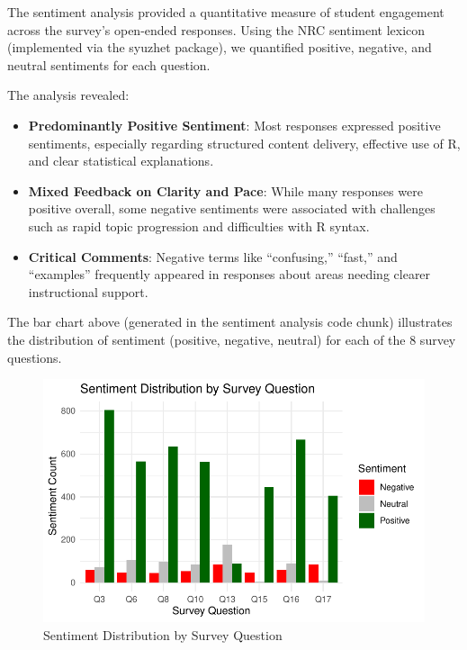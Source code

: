 \documentclass[
  letterpaper,
  DIV=11,
  numbers=noendperiod]{scrartcl}
\begin{document}
The sentiment analysis provided a quantitative measure of student
engagement across the survey's open-ended responses. Using the NRC
sentiment lexicon (implemented via the syuzhet package), we quantified
positive, negative, and neutral sentiments for each question.

The analysis revealed:

\begin{itemize}
\item
  \textbf{Predominantly Positive Sentiment}: Most responses expressed
  positive sentiments, especially regarding structured content delivery,
  effective use of R, and clear statistical explanations.
\item
  \textbf{Mixed Feedback on Clarity and Pace}: While many responses were
  positive overall, some negative sentiments were associated with
  challenges such as rapid topic progression and difficulties with R
  syntax.
\item
  \textbf{Critical Comments}: Negative terms like ``confusing,''
  ``fast,'' and ``examples'' frequently appeared in responses about
  areas needing clearer instructional support.
\end{itemize}

The bar chart above (generated in the sentiment analysis code chunk)
illustrates the distribution of sentiment (positive, negative, neutral)
for each of the 8 survey questions.

\begin{figure}[H]

\caption{Sentiment Distribution by Survey Question}

{\centering \includegraphics{paper_files/figure-pdf/sentiment-plot-1.pdf}

}

\end{figure}%
\end{document}
